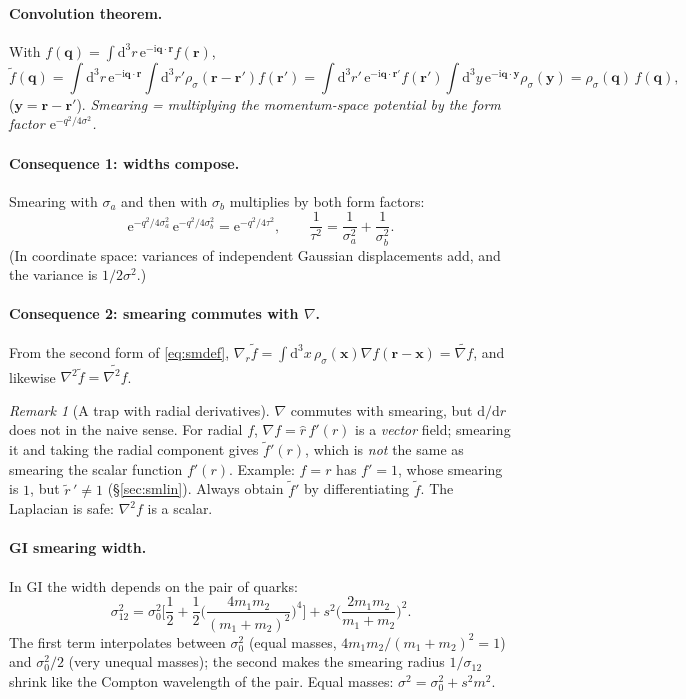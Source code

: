 \documentclass[11pt,a4paper]{article}
\numberwithin{equation}{section}
\theoremstyle{definition}
\theoremstyle{plain}
\theoremstyle{remark}
\newtheorem{remark}[definition]{Remark}
\numberwithin{algorithm}{section}
\newcommand{\vr}{\bm r}
\newcommand{\vq}{\bm q}
\newcommand{\dd}{\mathrm{d}}
\newcommand{\ii}{\mathrm{i}}
\newcommand{\ee}{\mathrm{e}}
\begin{document}
\paragraph{Convolution theorem.} With $f(\vq)=\int\dd^3r\,\ee^{-\ii\vq\cdot\vr}f(\vr)$,
\begin{equation}
\tilde f(\vq)=\int\dd^3r\,\ee^{-\ii\vq\cdot\vr}\!\int\dd^3r'\rho_\sigma(\vr-\vr')f(\vr')
=\int\dd^3r'\,\ee^{-\ii\vq\cdot\vr'}f(\vr')\int\dd^3y\,\ee^{-\ii\vq\cdot\bm y}\rho_\sigma(\bm y)=\rho_\sigma(\vq)\,f(\vq),
\end{equation}
($\bm y=\vr-\vr'$). \emph{Smearing = multiplying the momentum-space potential by the form factor $\ee^{-q^2/4\sigma^2}$.}

\paragraph{Consequence 1: widths compose.} Smearing with $\sigma_a$ and then with $\sigma_b$ multiplies by both form factors:
\begin{equation}
\ee^{-q^2/4\sigma_a^2}\,\ee^{-q^2/4\sigma_b^2}=\ee^{-q^2/4\tau^2},\qquad
\frac1{\tau^2}=\frac1{\sigma_a^2}+\frac1{\sigma_b^2}.
\label{eq:compose}
\end{equation}
(In coordinate space: variances of independent Gaussian displacements add, and the variance is $1/2\sigma^2$.)

\paragraph{Consequence 2: smearing commutes with $\nabla$.} From the second form of \eqref{eq:smdef}, $\nabla_r\tilde f=\int\dd^3x\,\rho_\sigma(\bm x)\nabla f(\vr-\bm x)=\widetilde{\nabla f}$, and likewise $\nabla^2\tilde f=\widetilde{\nabla^2f}$.
\begin{remark}[A trap with radial derivatives]
$\nabla$ commutes with smearing, but $\dd/\dd r$ does not in the naive sense. For radial $f$, $\nabla f=\hat r\,f'(r)$ is a \emph{vector} field; smearing it and taking the radial component gives $\tilde f'(r)$, which is \emph{not} the same as smearing the scalar function $f'(r)$. Example: $f=r$ has $f'=1$, whose smearing is $1$, but $\tilde r\,'\neq1$ (\S\ref{sec:smlin}). Always obtain $\tilde f'$ by differentiating $\tilde f$. The Laplacian is safe: $\nabla^2f$ is a scalar.
\end{remark}

\paragraph{GI smearing width.} In GI the width depends on the pair of quarks:
\begin{equation}
\sigma_{12}^2=\sigma_0^2\Big[\frac12+\frac12\Big(\frac{4m_1m_2}{(m_1+m_2)^2}\Big)^4\Big]+s^2\Big(\frac{2m_1m_2}{m_1+m_2}\Big)^2 .
\label{eq:sigma12}
\end{equation}
The first term interpolates between $\sigma_0^2$ (equal masses, $4m_1m_2/(m_1+m_2)^2=1$) and $\sigma_0^2/2$ (very unequal masses); the second makes the smearing radius $1/\sigma_{12}$ shrink like the Compton wavelength of the pair. Equal masses: $\sigma^2=\sigma_0^2+s^2m^2$.
\end{document}
